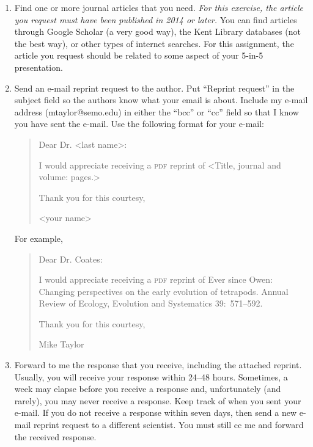 \documentclass[12pt]{article}
\begin{document}
\begin{enumerate}[leftmargin=*]

\item Find one or more journal articles that you need. \emph{For this exercise, the
article you request must have been published in 2014 or later.} You can
find articles through Google
Scholar (a very good way), the Kent Library databases (not the best way), or other types of internet searches. For
this assignment, the article you request should be related to some 
aspect of your 5-in-5 presentation.

\item Send an e-mail reprint request to the author. Put ``Reprint request'' in the subject field so the authors know what your email is about. Include my
e-mail address (mtaylor@semo.edu) in either the ``bcc'' or ``cc'' field
so that I know you have sent the e-mail. Use the following format for
your e-mail:

\begin{quote}
Dear Dr. \textless{}last name\textgreater{}:\vspace*{0.5\baselineskip}

I would appreciate receiving a \textsc{pdf} reprint of 
\textless{}Title, journal and volume: pages.\textgreater{} \vspace*{0.5\baselineskip}

Thank you for this courtesy, \vspace*{0.5\baselineskip}

\textless{}your name\textgreater{}
\end{quote}

\newpage

For example,

\begin{quote}
Dear Dr. Coates:\vspace*{0.5\baselineskip}

I would appreciate receiving a \textsc{pdf} reprint of %
Ever since Owen: Changing perspectives on the early evolution of
tetrapods. Annual Review of Ecology, Evolution and Systematics 39:~571--592.\vspace*{0.5\baselineskip}

Thank you for this courtesy,\vspace*{0.5\baselineskip}

Mike Taylor
\end{quote}

\item Forward to me the response that you receive, including the
attached reprint. Usually, you will receive your response within 24–48
hours. Sometimes, a week may elapse before you receive a response and,
unfortunately (and rarely), you may never receive a response. Keep track
of when you sent your e-mail. If you do not receive a response within
seven days, then send a new e-mail reprint request to a different
scientist. You must still cc me and forward the received response.


\end{enumerate}
\end{document}
